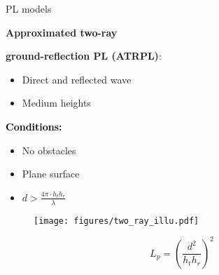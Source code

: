 \documentclass[10pt]{beamer}
\begin{document}
\begin{frame}{PL models}
\begin{minipage}{.45\textwidth}
\raggedright\textcolor{thomasred}{\textbf{Approximated two-ray}}\\
\raggedright\textcolor{thomasred}{\textbf{ground-reflection PL (ATRPL)}:}
\begin{itemize}
\item Direct and reflected wave
\item Medium heights
\end{itemize} 

\vspace{1em}
\textcolor{black}{\textbf{Conditions:}}
\begin{itemize}
\item No obstacles
\item Plane surface
\item $d > \frac{4\pi \cdot h_t h_r }{\lambda}$
\end{itemize}

\end{minipage}
\begin{minipage}{0.5\textwidth}
\begin{figure}[!htbp]
 \centering
  \texttt{[image: figures/two\_ray\_illu.pdf]}
  \end{figure}
\end{minipage}

\vspace{1em}
\begin{equation*}
L_{p} = \left(\frac{d^2}{h_t h_r}\right)^2
\label{two_ray_model}
\end{equation*}
\end{frame}
\end{document}
